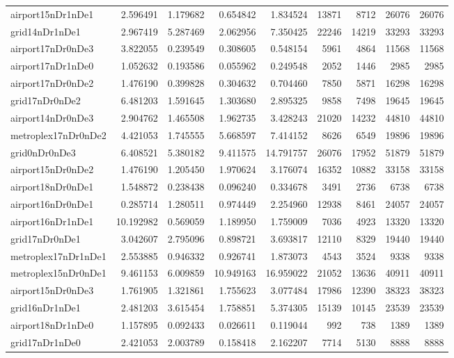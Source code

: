 \begin{longtable}{|l|r|r|r|r|r|r|r|r|}
airport15nDr1nDe1 & 2.596491 & 1.179682 & 0.654842 & 1.834524 & 13871 & 8712 & 26076 & 26076 \\
grid14nDr1nDe1 & 2.967419 & 5.287469 & 2.062956 & 7.350425 & 22246 & 14219 & 33293 & 33293 \\
airport17nDr0nDe3 & 3.822055 & 0.239549 & 0.308605 & 0.548154 & 5961 & 4864 & 11568 & 11568 \\
airport17nDr1nDe0 & 1.052632 & 0.193586 & 0.055962 & 0.249548 & 2052 & 1446 & 2985 & 2985 \\
airport17nDr0nDe2 & 1.476190 & 0.399828 & 0.304632 & 0.704460 & 7850 & 5871 & 16298 & 16298 \\
grid17nDr0nDe2 & 6.481203 & 1.591645 & 1.303680 & 2.895325 & 9858 & 7498 & 19645 & 19645 \\
airport14nDr0nDe3 & 2.904762 & 1.465508 & 1.962735 & 3.428243 & 21020 & 14232 & 44810 & 44810 \\
metroplex17nDr0nDe2 & 4.421053 & 1.745555 & 5.668597 & 7.414152 & 8626 & 6549 & 19896 & 19896 \\
grid0nDr0nDe3 & 6.408521 & 5.380182 & 9.411575 & 14.791757 & 26076 & 17952 & 51879 & 51879 \\
airport15nDr0nDe2 & 1.476190 & 1.205450 & 1.970624 & 3.176074 & 16352 & 10882 & 33158 & 33158 \\
airport18nDr0nDe1 & 1.548872 & 0.238438 & 0.096240 & 0.334678 & 3491 & 2736 & 6738 & 6738 \\
airport16nDr0nDe1 & 0.285714 & 1.280511 & 0.974449 & 2.254960 & 12938 & 8461 & 24057 & 24057 \\
airport16nDr1nDe1 & 10.192982 & 0.569059 & 1.189950 & 1.759009 & 7036 & 4923 & 13320 & 13320 \\
grid17nDr0nDe1 & 3.042607 & 2.795096 & 0.898721 & 3.693817 & 12110 & 8329 & 19440 & 19440 \\
metroplex17nDr1nDe1 & 2.553885 & 0.946332 & 0.926741 & 1.873073 & 4543 & 3524 & 9338 & 9338 \\
metroplex15nDr0nDe1 & 9.461153 & 6.009859 & 10.949163 & 16.959022 & 21052 & 13636 & 40911 & 40911 \\
airport15nDr0nDe3 & 1.761905 & 1.321861 & 1.755623 & 3.077484 & 17986 & 12390 & 38323 & 38323 \\
grid16nDr1nDe1 & 2.481203 & 3.615454 & 1.758851 & 5.374305 & 15139 & 10145 & 23539 & 23539 \\
airport18nDr1nDe0 & 1.157895 & 0.092433 & 0.026611 & 0.119044 & 992 & 738 & 1389 & 1389 \\
grid17nDr1nDe0 & 2.421053 & 2.003789 & 0.158418 & 2.162207 & 7714 & 5130 & 8888 & 8888 \\

\end{longtable}
